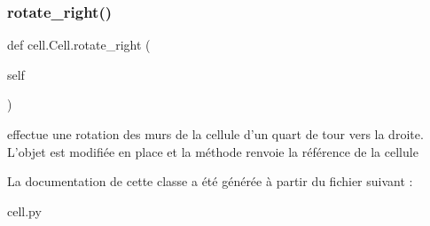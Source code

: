 \subsubsection{\texorpdfstring{rotate\+\_\+right()}{rotate\_right()}}
{\footnotesize\ttfamily def cell.\+Cell.\+rotate\+\_\+right (\begin{DoxyParamCaption}\item[{}]{self }\end{DoxyParamCaption})}

\begin{DoxyVerb}effectue une rotation des murs de la cellule d'un quart de tour vers la droite.
L'objet est modifiée en place et  la méthode renvoie la référence de la cellule
\end{DoxyVerb}
 

La documentation de cette classe a été générée à partir du fichier suivant \+:\begin{DoxyCompactItemize}
\item 
cell.\+py\end{DoxyCompactItemize}
